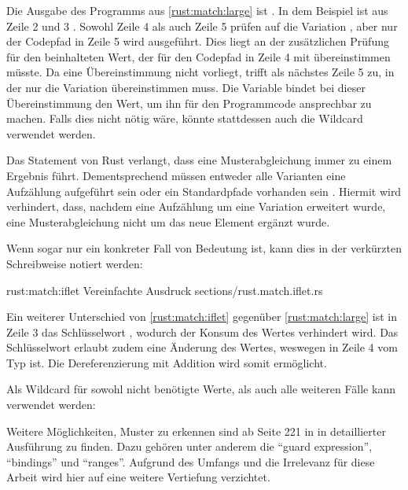 Die Ausgabe des Programms aus \autoref{rust:match:large} ist .
In dem Beispiel ist  aus Zeile 2 und 3 .
Sowohl Zeile 4 als auch Zeile 5 prüfen auf die Variation , aber nur der Codepfad in Zeile 5 wird ausgeführt.
Dies liegt an der zusätzlichen Prüfung für den beinhalteten Wert, der für den Codepfad in Zeile 4 mit  übereinstimmen müsste.
Da eine Übereinstimmung nicht vorliegt, trifft als nächstes Zeile 5 zu, in der nur die Variation  übereinstimmen muss.
Die Variable  bindet bei dieser Übereinstimmung den Wert, um ihn für den Programmcode ansprechbar zu machen.
Falls dies nicht nötig wäre, könnte stattdessen auch die Wildcard \rustcinline{_} verwendet werden.

Das  Statement von Rust verlangt, dass eine Musterabgleichung immer zu einem Ergebnis führt.
Dementsprechend müssen entweder alle Varianten eine Aufzählung aufgeführt sein oder ein Standardpfade vorhanden sein \rustcinline{_ => \{ \} }.
Hiermit wird verhindert, dass, nachdem eine Aufzählung um eine Variation erweitert wurde, eine Musterabgleichung nicht um das neue Element ergänzt wurde.

Wenn sogar nur ein konkreter Fall von Bedeutung ist, kann dies in der verkürzten  Schreibweise notiert werden:

\rustcinclude
	{rust:match:iflet}
	{Vereinfachte  Ausdruck}
	{sections/rust.match.iflet.rs}

Ein weiterer Unterschied von \autoref{rust:match:iflet} gegenüber \autoref{rust:match:large} ist in Zeile 3 das Schlüsselwort , wodurch der Konsum des Wertes verhindert wird.
Das Schlüsselwort  erlaubt zudem eine Änderung des Wertes, weswegen  in Zeile 4 vom Typ  ist.
Die Dereferenzierung mit Addition wird somit ermöglicht.

Als Wildcard für sowohl nicht benötigte Werte, als auch alle weiteren Fälle kann \rustcinline{_} verwendet werden: 

Weitere Möglichkeiten, Muster zu erkennen sind ab Seite 221 in \cite{rust:orly_programming} in detaillierter Ausführung zu finden.
Dazu gehören unter anderem die \enquote{guard expression}, \enquote{bindings} und \enquote{ranges}.
Aufgrund des Umfangs und die Irrelevanz für diese Arbeit wird hier auf eine weitere Vertiefung verzichtet.

